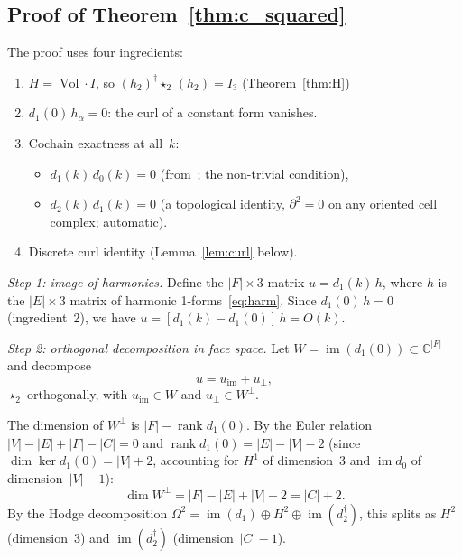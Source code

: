 \documentclass[preprint,12pt]{elsarticle}
\DeclareMathOperator{\Vol}{Vol}
\DeclareMathOperator{\rank}{rank}
\DeclareMathOperator{\im}{im}
\begin{document}
\subsection{Proof of Theorem~\ref{thm:c_squared}}
\label{sec:proof}

The proof uses four ingredients:
\begin{enumerate}
\item $H = \Vol \cdot I$, so $(h_2)^\dagger \star_2\, (h_2) = I_3$
  \hfill (Theorem~\ref{thm:H})
\item $d_1(0)\, h_\alpha = 0$: the curl of a constant form vanishes.
\item Cochain exactness at all~$k$:
  \begin{itemize}
  \item $d_1(k)\, d_0(k) = 0$ (from~\cite{paper1}; the non-trivial condition),
  \item $d_2(k)\, d_1(k) = 0$ (a topological identity, $\partial^2 = 0$ on
    any oriented cell complex; automatic).
  \end{itemize}
\item Discrete curl identity (Lemma~\ref{lem:curl} below).
\end{enumerate}

\emph{Step 1: image of harmonics.}
Define the $|F| \times 3$ matrix $u = d_1(k)\, h$, where $h$ is the
$|E| \times 3$ matrix of harmonic 1-forms~\eqref{eq:harm}. Since
$d_1(0)\, h = 0$ (ingredient~2), we have
$u = [d_1(k) - d_1(0)]\, h = O(k)$.

\emph{Step 2: orthogonal decomposition in face space.}
Let $W = \im(d_1(0)) \subset \mathbb{C}^{|F|}$ and decompose
\begin{equation}
  u = u_{\mathrm{im}} + u_\perp,
  \label{eq:u_decomp}
\end{equation}
$\star_2$-orthogonally, with $u_{\mathrm{im}} \in W$ and
$u_\perp \in W^\perp$.

The dimension of $W^\perp$ is $|F| - \rank d_1(0)$. By the Euler
relation $|V| - |E| + |F| - |C| = 0$ and
$\rank d_1(0) = |E| - |V| - 2$ (since $\dim\ker d_1(0) = |V| + 2$,
accounting for $H^1$ of dimension~3 and $\im d_0$ of dimension~$|V|-1$):
\begin{equation}
  \dim W^\perp = |F| - |E| + |V| + 2 = |C| + 2.
  \label{eq:complement_dim}
\end{equation}
By the Hodge decomposition $\Omega^2 = \im(d_1) \oplus H^2 \oplus \im(d_2^\dagger)$,
this splits as $H^2$ (dimension~3) and $\im(d_2^\dagger)$ (dimension~$|C|-1$).
\end{document}
